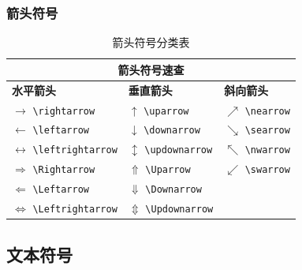 \documentclass{article}
\begin{document}
\subsubsection{箭头符号}
\renewcommand{\arraystretch}{1.5}
\begin{table}[H]
    \centering
    \begin{tabular}{@{}lll@{}}
        \toprule
        \multicolumn{3}{c}{\textbf{箭头符号速查}}                                                                        \\
        \midrule
        \textbf{水平箭头}                            & \textbf{垂直箭头}                      & \textbf{斜向箭头}              \\
        \midrule
        $\rightarrow$ \verb|\rightarrow|         & $\uparrow$ \verb|\uparrow|         & $\nearrow$ \verb|\nearrow| \\
        $\leftarrow$ \verb|\leftarrow|           & $\downarrow$ \verb|\downarrow|     & $\searrow$ \verb|\searrow| \\
        $\leftrightarrow$ \verb|\leftrightarrow| & $\updownarrow$ \verb|\updownarrow| & $\nwarrow$ \verb|\nwarrow| \\
        $\Rightarrow$ \verb|\Rightarrow|         & $\Uparrow$ \verb|\Uparrow|         & $\swarrow$ \verb|\swarrow| \\
        $\Leftarrow$ \verb|\Leftarrow|           & $\Downarrow$ \verb|\Downarrow|     &                            \\
        $\Leftrightarrow$ \verb|\Leftrightarrow| & $\Updownarrow$ \verb|\Updownarrow| &                            \\
        \bottomrule
    \end{tabular}
    \caption{箭头符号分类表}
\end{table}
\renewcommand{\arraystretch}{1}

\subsection{文本符号}
\end{document}
